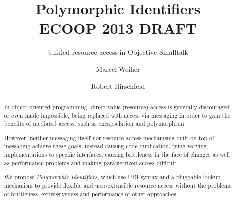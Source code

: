 \documentclass[preprint,authoryear]{llncs}
\begin{document}



\title{Polymorphic Identifiers\\--ECOOP 2013 DRAFT--}
\subtitle{Unified resource access in Objective-Smalltalk}

\author{Marcel Weiher \and Robert Hirschfeld}



\maketitle

\begin{abstract}

In object oriented programming, direct value (resource) access is generally discouraged or 
even made impossible, being replaced with access via messaging in order to
gain the benefits of mediated access, such as encapsulation and polymorphism.

However, neither messaging itself nor resource access mechanisms built on top
of messaging achieve these goals, instead causing code duplication, tying varying 
implementations to specific interfaces, causing brittleness in the face of changes as well
as performance problems and making parametrized access difficult.

We propose \emph{Polymorphic Identifiers}, which
use URI syntax and a pluggable lookup mechanism to provide
flexible and user-extensible resource access without the problems
of brittleness, expressiveness and performance of other approaches.

\end{abstract}

\end{document}
